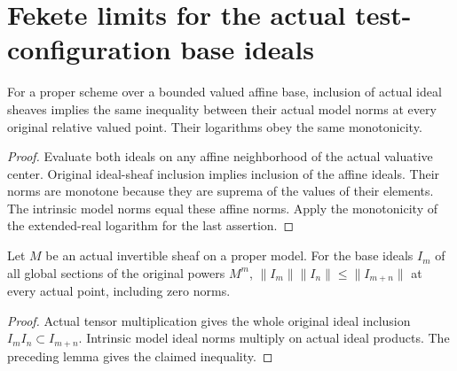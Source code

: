 \section{Fekete limits for the actual test-configuration base ideals}

\begin{lemma}\label{lem:model-ideal-norm-monotone}
\leanok
{}
For a proper scheme over a bounded valued affine base, inclusion of actual
ideal sheaves implies the same inequality between their actual model norms
at every original relative valued point. Their logarithms obey the same
monotonicity.
\end{lemma}
\begin{proof}
Evaluate both ideals on any affine neighborhood of the actual valuative
center. Original ideal-sheaf inclusion implies inclusion of the affine
ideals. Their norms are monotone because they are suprema of the values
of their elements. The intrinsic model norms equal these affine norms.
Apply the monotonicity of the extended-real logarithm for the last assertion.
\end{proof}

\begin{lemma}\label{lem:native-power-base-ideal-supermultiplicative}
\leanok
{}
Let $M$ be an actual invertible sheaf on a proper model. For the base ideals
$I_m$ of all global sections of the original powers $M^m$,
$\|I_m\|\|I_n\|\leq\|I_{m+n}\|$ at every actual point, including zero norms.
\end{lemma}
\begin{proof}
Actual tensor multiplication gives the whole original ideal inclusion
$I_m I_n\subset I_{m+n}$. Intrinsic model ideal norms multiply on actual
ideal products. The preceding lemma gives the claimed inequality.
\end{proof}

